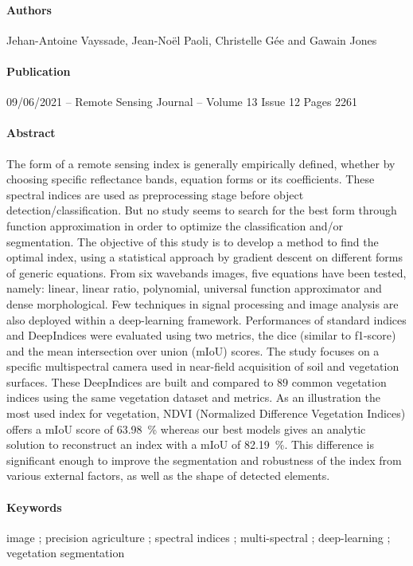 \documentclass[../thesis.tex]{subfiles}
\begin{document}
	\paragraph{Authors} Jehan-Antoine Vayssade, Jean-Noël Paoli, Christelle Gée and Gawain Jones
	
	\paragraph{Publication} 09/06/2021 -- Remote Sensing Journal -- Volume 13 Issue 12 Pages 2261
	
	\paragraph{Abstract} The form of a remote sensing index is generally empirically defined, whether by choosing specific reflectance bands, equation forms or its coefficients. These spectral indices are used as preprocessing stage before object detection/classification. But no study seems to search for the best form through function approximation in order to optimize the classification and/or segmentation. The objective of this study is to develop a method to find the optimal index, using a statistical approach by gradient descent on different forms of generic equations. From six wavebands images, five equations have been tested, namely: linear, linear ratio, polynomial, universal function approximator and dense morphological. Few techniques in signal processing and image analysis are also deployed within a deep-learning framework. Performances of standard indices and DeepIndices were evaluated using two metrics, the dice (similar to f1-score) and the mean intersection over union (mIoU) scores. The study focuses on a specific multispectral camera used in near-field acquisition of soil and vegetation surfaces. These DeepIndices are built and compared to $89$ common vegetation indices using the same vegetation dataset and metrics. As an illustration the most used index for vegetation, NDVI (Normalized Difference Vegetation Indices) offers a mIoU score of \SI{63.98}{\percent} whereas our best models gives an analytic solution to reconstruct an index with a mIoU of \SI{82.19}{\percent}. This difference is significant enough to improve the segmentation and robustness of the index from various external factors, as well as the shape of detected elements.
	
	\paragraph{Keywords} image ; precision agriculture ; spectral indices ; multi-spectral ; deep-learning ; vegetation segmentation
    \vfill
	
\end{document}
